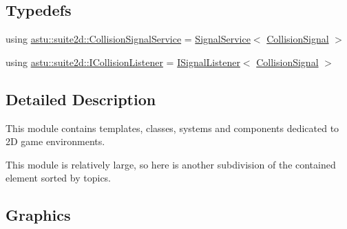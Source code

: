 \subsection*{Typedefs}
\begin{DoxyCompactItemize}
\item 
using \hyperlink{group__suite2d__group_ga0c9e81f269e1428bc82940c6c2682898}{astu\+::suite2d\+::\+Collision\+Signal\+Service} = \hyperlink{classastu_1_1SignalService}{Signal\+Service}$<$ \hyperlink{classastu_1_1suite2d_1_1CollisionSignal}{Collision\+Signal} $>$
\item 
using \hyperlink{group__suite2d__group_ga089a780e9b5412a85eaf3c0f2e60a300}{astu\+::suite2d\+::\+I\+Collision\+Listener} = \hyperlink{classastu_1_1ISignalListener}{I\+Signal\+Listener}$<$ \hyperlink{classastu_1_1suite2d_1_1CollisionSignal}{Collision\+Signal} $>$
\end{DoxyCompactItemize}


\subsection{Detailed Description}
This module contains templates, classes, systems and components dedicated to 2D game environments. 

This module is relatively large, so here is another subdivision of the contained element sorted by topics.\hypertarget{group__suite2d__group_graph_sect}{}\subsection{Graphics}\label{group__suite2d__group_graph_sect}


